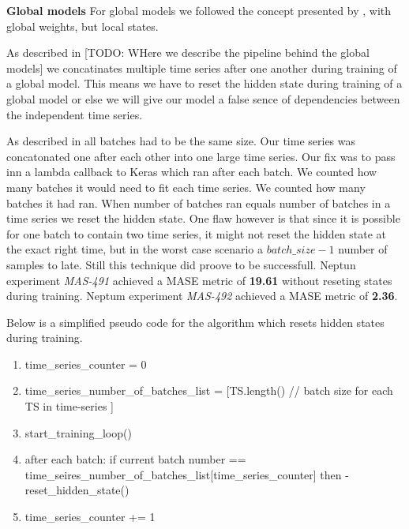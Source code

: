 \textbf{Global models}
For global models we followed the concept presented by \cite{Smyl2020},
with global weights, but local states.

As described in [TODO: WHere we describe the pipeline behind the global models]
we concatinates multiple time series after one another during training of a global model.
This means we have to reset the hidden state during training of a global model
or else we will give our model a false sence of dependencies between
the independent time series.

As described in  all
batches had to be the same size. Our time series was concatonated one after
each other into one large time series.
Our fix was to pass inn a lambda callback to Keras which ran after each batch.
We counted how many batches it would need to fit each time series.
We counted how many batches it had ran. When number of batches ran equals
number of batches in a time series we reset the hidden state.
One flaw however is that since it is possible for one batch to
contain two time series, it might not reset the hidden state at the exact
right time, but in the worst case scenario a $batch\_size - 1$ number of
samples to late. Still this technique did proove to be successfull.
Neptun experiment \textit{MAS-491} achieved a MASE metric of \textbf{19.61}
without reseting states during training.
Neptum experiment \textit{MAS-492} achieved a MASE metric of \textbf{2.36}.

Below is a simplified pseudo code for the algorithm which resets hidden states
during training.
\begin{enumerate}
  \item time\_series\_counter = 0
  \item time\_series\_number\_of\_batches\_list = [TS.length() // batch size for each TS in time-series ]
  \item start\_training\_loop()
  \item after each batch: if current batch number ==
        time\_seires\_number\_of\_batches\_list[time\_series\_counter]
        then -\> reset\_hidden\_state()
  \item time\_series\_counter += 1
\end{enumerate}







